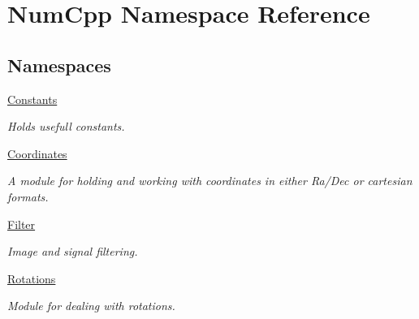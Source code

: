 \hypertarget{namespace_num_cpp}{}\section{Num\+Cpp Namespace Reference}
\label{namespace_num_cpp}
\subsection*{Namespaces}
\begin{DoxyCompactItemize}
\item 
 \mbox{\hyperlink{namespace_num_cpp_1_1_constants}{Constants}}
\begin{DoxyCompactList}\small\item\em Holds usefull constants. \end{DoxyCompactList}\item 
 \mbox{\hyperlink{namespace_num_cpp_1_1_coordinates}{Coordinates}}
\begin{DoxyCompactList}\small\item\em A module for holding and working with coordinates in either Ra/\+Dec or cartesian formats. \end{DoxyCompactList}\item 
 \mbox{\hyperlink{namespace_num_cpp_1_1_filter}{Filter}}
\begin{DoxyCompactList}\small\item\em Image and signal filtering. \end{DoxyCompactList}\item 
 \mbox{\hyperlink{namespace_num_cpp_1_1_rotations}{Rotations}}
\begin{DoxyCompactList}\small\item\em Module for dealing with rotations. \end{DoxyCompactList}\end{DoxyCompactItemize}
